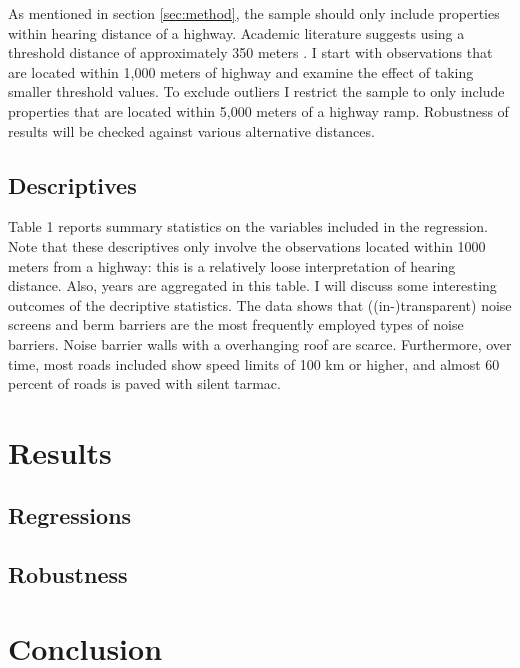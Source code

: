 \documentclass[12pt,a4paper]{scrartcl}
\begin{document}
		As mentioned in section \ref{sec:method}, the sample should only include properties within hearing distance of a highway. Academic literature suggests using a threshold distance of approximately 350 meters \citep{Nelson1982}. I start with observations that are located within 1,000 meters of highway and examine the effect of taking smaller threshold values. To exclude outliers I restrict the sample to only include properties that are located within 5,000 meters of a highway ramp. Robustness of results will be checked against various alternative distances.
		
		\subsection{Descriptives}
        Table 1 reports summary statistics on the variables included in the regression. Note that these descriptives only involve the observations located within 1000 meters from a highway: this is a relatively loose interpretation of hearing distance. Also, years are aggregated in this table. I will discuss some interesting outcomes of the decriptive statistics. The data shows that ((in-)transparent) noise screens and berm barriers are the most frequently employed types of noise barriers. Noise barrier walls with a overhanging roof are scarce. Furthermore, over time, most roads included show speed limits of 100 km or higher, and almost 60 percent of roads is paved with silent tarmac.

     
	\section{Results}
	\label{sec:results}
	
		\subsection{Regressions}

	
    

		\subsection{Robustness}
	
	\section{Conclusion}
	\label{sec:conclusion}
	
	
	
	
	
\end{document}
